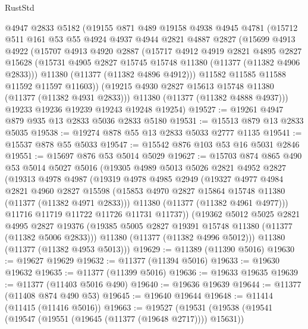 \begin{lexlean}{RustStd}
\begin{coremodule}
    @4947
    @2833
    @5182
    (@19155
      @871
      @489
      @19158
      @4938
      @4945
      @4781
      (@15712
        @511
        @161
        @53
        @55
        @4924
        @4937
        @4944
        @2821
        @4887
        @2827
        (@15699
          @4913
          @4922
          (@15707
            @4913
            @4920
            @2887
            (@15717
              @4912
              @4919
              @2821
              @4895
              @2827
              @15628
              (@15731 @4905 @2827 @15745 @15748 @11380 (@11377 (@11382 @4906 @2833)))
              @11380
              (@11377 (@11382 @4896 @4912)))
            @11582
            @11585
            @11588
            @11592
            @11597
            @11603))
        (@19215 @4930 @2827 @15613 @15748 @11380 (@11377 (@11382 @4931 @2833)))
        @11380
        (@11377 (@11382 @4888 @4937)))
      @19233
      @19236
      @19239
      @19243
      @19248
      @19254)
@19527 := @19261 @4947 @879 @935 @13 @2833 @5036 @2833 @5180
@19531 := @15513 @879 @13 @2833 @5035
@19538 := @19274 @878 @55 @13 @2833 @5033 @2777 @1135
@19541 := @15537 @878 @55 @5033
@19547 := @15542 @876 @103 @53 @16 @5031 @2846
@19551 := @15697 @876 @53 @5014 @5029
@19627 := @15703
    @874
    @865
    @490
    @53
    @5014
    @5027
    @5016
    (@19305
      @4989
      @5013
      @5026
      @2821
      @4952
      @2827
      (@19313
        @4978
        @4987
        (@19319
          @4978
          @4985
          @2949
          (@19327
            @4977
            @4984
            @2821
            @4960
            @2827
            @15598
            (@15853 @4970 @2827 @15864 @15748 @11380 (@11377 (@11382 @4971 @2833)))
            @11380
            (@11377 (@11382 @4961 @4977)))
          @11716
          @11719
          @11722
          @11726
          @11731
          @11737))
      (@19362
        @5012
        @5025
        @2821
        @4995
        @2827
        @19376
        (@19385 @5005 @2827 @19391 @15748 @11380 (@11377 (@11382 @5006 @2833)))
        @11380
        (@11377 (@11382 @4996 @5012)))
      @11380
      (@11377 (@11382 @4953 @5013)))
@19629 := @11389 (@11390 @5016)
@19630 := @19627 @19629
@19632 := @11377 (@11394 @5016)
@19633 := @19630 @19632
@19635 := @11377 (@11399 @5016)
@19636 := @19633 @19635
@19639 := @11377 (@11403 @5016 @490)
@19640 := @19636 @19639
@19644 := @11377 (@11408 @874 @490 @53)
@19645 := @19640 @19644
@19648 := @11414 (@11415 (@11416 @5016))
@19663 := @19527
    (@19531
      (@19538
        (@19541 (@19547 (@19551 (@19645 (@11377 (@19648 @2717)))) @15631))

\end{coremodule}
\end{lexlean}
